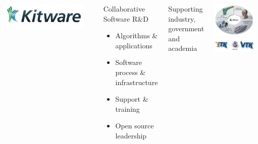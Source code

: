 \documentclass[10pt,aspectratio=169]{beamer}
\begin{document}
\begin{frame}
  \begin{columns}[onlytextwidth]
    \includegraphics[width=0.9\textwidth]{./logos/klogo.png}\\
    \vspace{0.1cm}
    \begin{block}{\color{kitwareblue} Collaborative Software R\&D}
      \begin{itemize}%
        \item Algorithms \& applications
        \item Software process \& infrastructure
        \item Support \& training
        \item Open source leadership
      \end{itemize}
    \end{block}
    \begin{block}{\color{kitwareblue} Supporting industry, government and academia}
    \end{block}
    \centering
    \includegraphics[width=0.9\textwidth]{./logos/kitware_pie.png}\\
    \includegraphics[width=0.9\textwidth]{./logos/kitware_itk_slicer_vtk_logos.png}
  \end{columns}
\end{frame}
\end{document}

